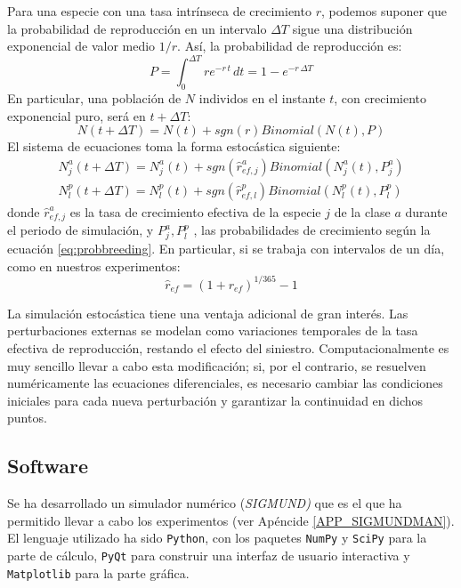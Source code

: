 Para una especie con una tasa intrínseca de crecimiento $r$, podemos suponer que la probabilidad de reproducción en un intervalo $\Delta T$ sigue una distribución exponencial de valor medio $1/r$. Así, la probabilidad de reproducción es:
\begin{equation}
\label{eq:probbreeding}
P = \int_0^{\Delta T} \! re^{-r\, t}  \, dt = 1 - e^{-r\, \Delta T}
\end{equation}
En particular, una población de $N$ individos en el instante $t$, con crecimiento exponencial puro, será en $t+\Delta T$:
\begin{equation}
N(t+\Delta T)=N(t) + sgn \left(r \right) Binomial \left( N(t),P \right)
\end{equation}
\noindent El sistema de ecuaciones toma la forma estocástica siguiente:
\begin{equation}
\begin{split}
N^{a}_{j}(t+\Delta T)=N^{a}_{j}(t) + sgn \left(\hat{r}^{a}_{ef,j} \right) Binomial \left( N^{a}_{j}(t),P^{a}_{j}\right)\\
N^{p}_{l}(t+\Delta T)=N^{p}_{l}(t) + sgn \left(\hat{r}^{p}_{ef,l} \right) Binomial \left(N^{p}_{l}(t),P^{p}_{l} \right)
\end{split}
\end{equation}
\noindent donde $\hat{r}^{a}_{ef,j}$ es la tasa de crecimiento efectiva de la especie $j$ de la clase $a$ durante el periodo de simulación, y $P^{a}_{j}, P^{p}_{l}$ , las probabilidades de crecimiento según la ecuación \ref{eq:probbreeding}. En particular, si se trabaja con intervalos de un día, como en nuestros experimentos:
\begin{equation}
\hat{r}_{ef} = (1+r_{ef})^{1/365}-1
\end{equation}

La simulación estocástica tiene una ventaja adicional de gran interés. Las perturbaciones externas se modelan como variaciones temporales de la tasa efectiva de reproducción, restando el efecto del siniestro. Computacionalmente es muy sencillo llevar a cabo esta modificación; si, por el contrario, se resuelven numéricamente las ecuaciones diferenciales, es necesario cambiar las condiciones iniciales para cada nueva perturbación y garantizar la continuidad en dichos puntos.

\subsection{Software}
Se ha desarrollado un simulador numérico (\textit{SIGMUND)} que es el que ha permitido llevar a cabo los experimentos (ver Apéncide \ref{APP_SIGMUNDMAN}). El lenguaje utilizado ha sido \texttt{Python}, con los paquetes \texttt{NumPy} y \texttt{SciPy} para la parte de cálculo, \texttt{PyQt} para construir una interfaz de usuario interactiva y \texttt{Matplotlib} para la parte gráfica.

